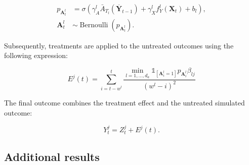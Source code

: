 \documentclass{article}
\theoremstyle{plain}
\theoremstyle{definition}
\theoremstyle{remark}
\begin{document}
\begin{equation*}
\begin{aligned}
    p_{\mathbf{A}_t^l} &= \sigma\left(\gamma_A^l \bar{A}_{T_l}\left(\overline{\mathbf{Y}}_{t-1}\right) + \gamma_X^l f_Y^l\left(\mathbf{X}_t\right) + b_l\right), \\
    \mathbf{A}_t^l &\sim \operatorname{Bernoulli}\left(p_{\mathbf{A}_t^l}\right).
\end{aligned}
\end{equation*}

Subsequently, treatments are applied to the untreated outcomes using the following expression:

\begin{equation}
E^j(t) = \sum_{i=t-w^l}^t \frac{\min_{l=1, \ldots, d_a} \mathbb{1}_{\left[\mathbf{A}_i^l=1\right]} p_{\mathbf{A}_i^l} \beta_{l j}}{\left(w^l-i\right)^2}
\end{equation}

The final outcome combines the treatment effect and the untreated simulated outcome:

\begin{equation}
Y^j_t = Z^j_t + E^j(t).
\end{equation}


\subsection{Additional results}
\label{subsect: detailed_results_mimic}
\end{document}
